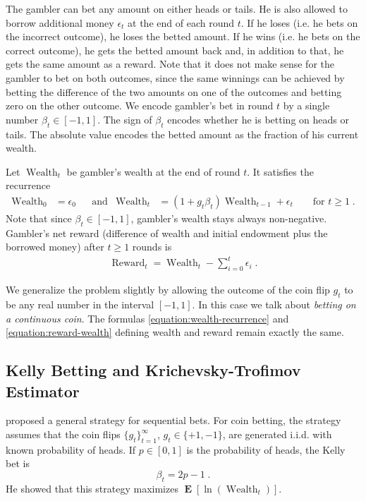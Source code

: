 \documentclass{colt2016_empty} %
\DeclareMathOperator*{\Exp}{\mathbf{E}}
\DeclareMathOperator{\Wealth}{Wealth}
\DeclareMathOperator{\Reward}{Reward}
\begin{document}
The gambler can bet any amount on either heads or tails. He is also
allowed to borrow additional money $\epsilon_t$ at the end of each round $t$. If he loses (i.e. he bets on the
incorrect outcome), he loses the betted amount. If he wins (i.e. he bets on the
correct outcome), he gets the betted amount back and, in addition to that, he
gets the same amount as a reward. Note that it does not make sense for the
gambler to bet on both outcomes, since the same winnings can be achieved by
betting the difference of the two amounts on one of the outcomes and betting
zero on the other outcome. We encode gambler's bet in round $t$ by a single
number $\beta_t \in [-1,1]$. The sign of $\beta_t$ encodes whether he is betting
on heads or tails. The absolute value encodes the betted amount as the fraction
of his current wealth.

Let $\Wealth_t$ be gambler's wealth at the end of round $t$. It satisfies the
recurrence
\begin{align}
\label{equation:wealth-recurrence}
\Wealth_0 & = \epsilon_0 &
& \text{and} &
\Wealth_t & = (1 + g_t \beta_t) \Wealth_{t-1} + \epsilon_{t} \qquad \text{for $t \ge 1$} \; .
\end{align}
Note that since $\beta_t \in [-1,1]$, gambler's wealth stays always non-negative.
Gambler's net reward (difference of wealth and initial endowment plus the borrowed money) after $t\geq1$
rounds is
\begin{align}
\label{equation:reward-wealth}
\Reward_t = \Wealth_t - \sum_{i=0}^t \epsilon_i \; .
\end{align}

We generalize the problem slightly by allowing the outcome of the coin flip
$g_t$ to be any real number in the interval $[-1,1]$. In this case we talk about
\emph{betting on a continuous coin}. The formulas
\eqref{equation:wealth-recurrence} and \eqref{equation:reward-wealth} defining
wealth and reward remain exactly the same.

\subsection{Kelly Betting and Krichevsky-Trofimov Estimator}

\citet{Kelly56} proposed a general strategy for sequential bets. For coin
betting, the strategy assumes that the coin flips $\{g_t\}_{t=1}^\infty$, $g_t
\in \{+1,-1\}$, are generated i.i.d. with known probability of heads. If $p \in
[0,1]$ is the probability of heads, the Kelly bet is
$$
\beta_t = 2p - 1 \; .
$$
He showed that this strategy maximizes $\Exp[\ln(\Wealth_t)]$.
\end{document}

